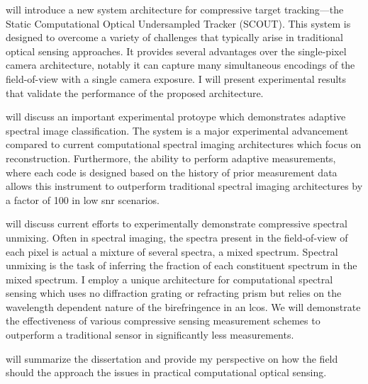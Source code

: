  will introduce a new system architecture for compressive target tracking---the Static Computational Optical Undersampled Tracker (SCOUT). This system is designed to overcome a variety of challenges that typically arise in traditional optical sensing approaches. It provides several advantages over the single-pixel camera architecture, notably it can capture many simultaneous encodings of the field-of-view with a single camera exposure. I will present experimental results that validate the performance of the proposed architecture. 

 will discuss an important experimental protoype which demonstrates adaptive spectral image classification. The system is a major experimental advancement compared to current computational spectral imaging architectures which focus on reconstruction. Furthermore, the ability to perform adaptive measurements, where each code is designed based on the history of prior measurement data allows this instrument to outperform traditional spectral imaging architectures by a factor of 100 in low \gls{snr} scenarios.

 will discuss current efforts to experimentally demonstrate compressive spectral unmixing. Often in spectral imaging, the spectra present in the field-of-view of each pixel is actual a mixture of several spectra, a mixed spectrum. Spectral unmixing is the task of inferring the fraction of each constituent spectrum in the mixed spectrum. I employ a unique architecture for computational spectral sensing which uses no diffraction grating or refracting prism but relies on the wavelength dependent nature of the birefringence in an \gls{lcos}. We will demonstrate the effectiveness of various compressive sensing measurement schemes to outperform a traditional sensor in significantly less measurements. 

 will summarize the dissertation and provide my perspective on how the field should the approach the issues in practical computational optical sensing.


%  
%

